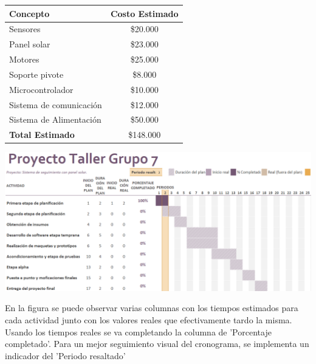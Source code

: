 \documentclass[a4paper,12pt]{article}
\begin{document}
\begin{table}[h!]
        \centering
        \begin{tabular}{|l|c|}
            \hline
            Concepto  & Costo Estimado \\ 
            \hline
            Sensores & \$20.000 \\
            Panel solar  & \$23.000 \\
            Motores  & \$25.000 \\
            Soporte pivote & \$8.000 \\
            Microcontrolador  & \$10.000 \\
            Sistema de comunicación  & \$12.000 \\
            Sistema de Alimentación  & \$50.000 \\
            \hline
            \textbf{Total Estimado} & \$148.000 \\
            \hline
        \end{tabular}
        \label{tabla}
        
    \end{table}


\newpage
\begin{landscape}
    \thispagestyle{empty} %
    \begin{center}
        \includegraphics[width=0.95\linewidth]{grantt-V3.png}
        \label{cronograma}
    \end{center}
    En la figura se puede observar varias columnas con los tiempos estimados para cada actividad junto con los valores reales que efectivamente tardo la misma. Usando los tiempos reales se va completando la columna de 'Porcentaje completado'. Para un mejor seguimiento visual del cronograma, se implementa un indicador del 'Periodo resaltado'
\end{landscape}
\end{document}
